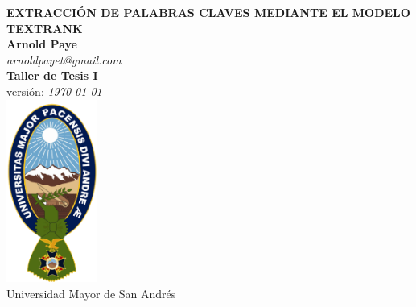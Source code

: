 \begin{titlepage}
	\vspace{3.0cm}
	\begin{center}
		{\huge\bfseries EXTRACCI\'ON DE PALABRAS CLAVES
		MEDIANTE EL MODELO TEXTRANK} \\
		\vspace{1.5cm}
		{\Large\bfseries Arnold Paye} \\ [5pt]
		\emph {arnoldpayet@gmail.com} \\[5pt]
		{\small\bfseries Taller de Tesis I} \\
		{\tiny versi\'on: \emph \today\ } \\
		\vspace{1.5cm}
		\includegraphics[width=3cm,height=6cm]{recursos/img/logo_umsa} \\
		{Universidad Mayor de San Andr\'es} 
	\end{center}
\end{titlepage}

